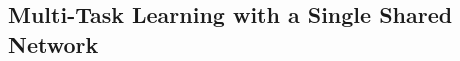 \documentclass[12pt]{article}
\begin{document}

\subsection{Multi-Task Learning with a Single Shared Network}
\label{subsec:multi-task-learning-with-a-single}
\end{document}
